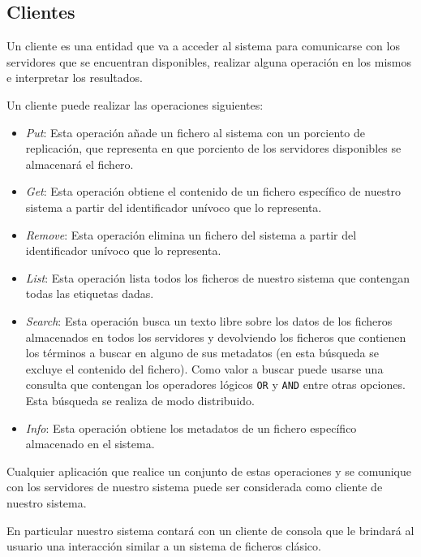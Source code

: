 \documentclass{article}
\begin{document}
\subsection{Clientes}

Un cliente es una entidad que va a acceder al sistema para comunicarse con los 
servidores que se encuentran disponibles, realizar alguna operación en los 
mismos e interpretar los resultados.

Un cliente puede realizar las operaciones siguientes:

\begin{itemize}
  \item \emph{Put}: Esta operación añade un fichero al sistema con
  un porciento de replicación, que representa en que porciento de los
  servidores disponibles se almacenará el fichero.
  
  \item \emph{Get}: Esta operación obtiene el contenido de un fichero específico
  de nuestro sistema a partir del identificador unívoco que lo representa.
  
  \item \emph{Remove}: Esta operación elimina un fichero del sistema a partir
  del identificador unívoco que lo representa.
  
  \item \emph{List}: Esta operación lista todos los ficheros de nuestro sistema
  que contengan todas las etiquetas dadas.
  
  \item \emph{Search}: Esta operación busca un texto libre sobre los datos
  de los ficheros almacenados en todos los servidores y devolviendo los
  ficheros que contienen los términos a buscar en alguno de sus metadatos (en
  esta búsqueda se excluye el contenido del fichero). Como valor a buscar puede
  usarse una consulta que contengan los operadores lógicos \verb|OR| y
  \verb|AND| entre otras opciones. Esta búsqueda se realiza de modo
  distribuido.
  
  \item \emph{Info}: Esta operación obtiene los metadatos de un fichero
  específico almacenado en el sistema.
\end{itemize}

Cualquier aplicación que realice un conjunto de estas operaciones y se
comunique con los servidores de nuestro sistema puede ser considerada como
cliente de nuestro sistema.

En particular nuestro sistema contará con un cliente de consola que le brindará
al usuario una interacción similar a un sistema de ficheros clásico.
\end{document}
